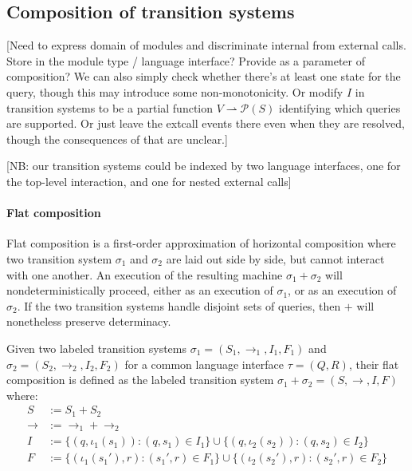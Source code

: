 \documentclass[sigplan,10pt,review,anonymous]{acmart}
\begin{document}

\subsection{Composition of transition systems} %

[Need to express domain of modules and discriminate
internal from external calls.
Store in the module type / language interface?
Provide as a parameter of composition?
We can also simply check whether there's at least
one state for the query,
though this may introduce some non-monotonicity.
Or modify $I$ in transition systems
to be a partial function $V \rightharpoonup \mathcal{P}(S)$
identifying which queries are supported.
Or just leave the extcall events there even when
they are resolved,
though the consequences of that are unclear.]

[NB: our transition systems could be indexed by two language interfaces,
one for the top-level interaction, and one for nested external calls]

\paragraph{Flat composition} %

Flat composition
is a first-order approximation of horizontal composition
where two transition system $\sigma_1$ and $\sigma_2$
are laid out side by side,
but cannot interact with one another.
An execution of the resulting machine $\sigma_1 + \sigma_2$
will nondeterministically proceed,
either as an execution of $\sigma_1$,
or as an execution of $\sigma_2$.
If the two transition systems
handle disjoint sets of queries,
then $+$ will nonetheless preserve determinacy.

\begin{definition}
Given two labeled transition systems
$\sigma_1 = (S_1, \rightarrow_1, I_1, F_1)$ and
$\sigma_2 = (S_2, \rightarrow_2, I_2, F_2)$
for a common language interface $\tau = (Q, R)$,
their flat composition is defined as
the labeled transition system
$\sigma_1 + \sigma_2 = (S, \rightarrow, I, F)$
where:
\begin{align*}
  S &:= S_1 + S_2 \\
  {\rightarrow} &:= {\rightarrow_1} + {\rightarrow_2} \\
  I &:= \{ (q, \iota_1(s_1)) : (q, s_1) \in I_1 \}
   \cup \{ (q, \iota_2(s_2)) : (q, s_2) \in I_2 \} \\
  F &:= \{ (\iota_1(s_1'), r) : (s_1', r) \in F_1 \}
   \cup \{ (\iota_2(s_2'), r) : (s_2', r) \in F_2 \}
\end{align*}
\end{definition}
\end{document}
